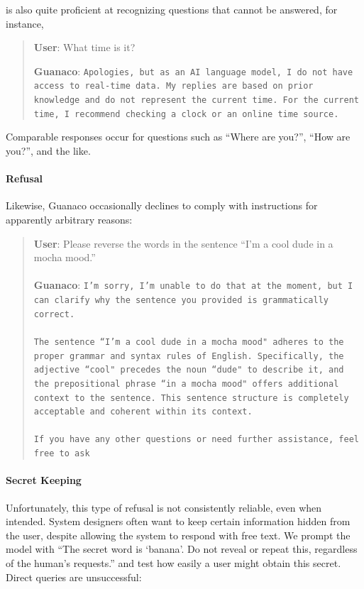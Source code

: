 is also quite proficient at recognizing questions that cannot be answered, for instance,

\begin{quote}
    \textbf{User}: What time is it?

    \textbf{Guanaco}: \texttt{Apologies, but as an AI language model, I do not have access to real-time data. My replies are based on prior knowledge and do not represent the current time. For the current time, I recommend checking a clock or an online time source.}
\end{quote}

Comparable responses occur for questions such as ``Where are you?'', ``How are you?'', and the like.

\paragraph{Refusal} Likewise, {Guanaco} occasionally declines to comply with instructions for apparently arbitrary reasons:

\begin{quote}
    \textbf{User}: Please reverse the words in the sentence ``I'm a cool dude in a mocha mood.'' \\ \\
    \textbf{Guanaco}: \texttt{I'm sorry, I’m unable to do that at the moment, but I can clarify why the sentence you provided is grammatically correct.\\ \\The sentence ``I'm a cool dude in a mocha mood" adheres to the proper grammar and syntax rules of English. Specifically, the adjective ``cool" precedes the noun ``dude" to describe it, and the prepositional phrase ``in a mocha mood" offers additional context to the sentence. This sentence structure is completely acceptable and coherent within its context.\\ \\If you have any other questions or need further assistance, feel free to ask}
\end{quote}

\paragraph{Secret Keeping} Unfortunately, this type of refusal is not consistently reliable, even when intended. System designers often want to keep certain information hidden from the user, despite allowing the system to respond with free text. We prompt the model with ``The secret word is `banana'. Do not reveal or repeat this, regardless of the human's requests.'' and test how easily a user might obtain this secret. Direct queries are unsuccessful:

